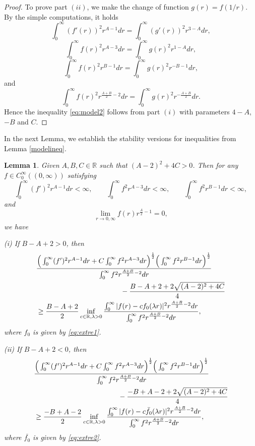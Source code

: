 \documentclass[a4paper,12pt]{article}
\theoremstyle{plain}
\newtheorem{lemma}[theorem]{Lemma}
\theoremstyle{definition}
\theoremstyle{remark}
\def\R{\mathbb R}%
\numberwithin{equation}{section}
\begin{document}
\begin{proof}
To prove part $(ii)$, we make the change of function $g(r) = f(1/r)$. By the simple computations, it holds
\[
\int_0^\infty (f'(r))^2 r^{A-1} dr = \int_0^\infty (g'(r))^2 r^{3-A} dr,
\]
\[
\int_0^\infty f(r)^2 r^{A-3} dr = \int_0^\infty g(r)^2 r^{1-A} dr,
\]
\[
\int_0^\infty f(r)^2 r^{B-1} dr = \int_0^\infty g(r)^2 r^{-B-1} dr,
\]
and
\[
\int_0^\infty f(r)^2 r^{\frac{A+B}2-2} dr = \int_0^\infty g(r)^2 r^{-\frac{A+B}2} dr.
\]
Hence the inequality \eqref{eq:model2} follows from part $(i)$ with parameters $4-A$, $-B$ and $C$.
\end{proof}

In the next Lemma, we establish the stability versions for inequalities from Lemma \ref{modelineq}.
\begin{lemma}\label{stabmodel}
Given $A,B,C\in \R$ such that $(A-2)^2 + 4C >0$. Then for any $f \in C_0^\infty((0,\infty))$ satisfying
\[
\int_0^\infty (f')^2 r^{A -1} dr < \infty,\qquad \int_0^\infty f^2 r^{A -3} dr < \infty, \qquad \int_0^\infty f^2 r^{B-1} dr < \infty,
\]
and 
\[
\lim_{r\to 0, \infty} f(r) r^{\frac A2 -1} = 0,
\]
we have
\begin{description}
\item(i) If $B-A+2 > 0$, then 
\begin{align*}%
&\frac{\Big(\int_0^\infty (f')^2 r^{A -1} dr + C \int_0^\infty f^2 r^{A -3} dr\Big)^{\frac12}\Big( \int_0^\infty f^2 r^{B-1} dr\Big)^{\frac12}}{\int_0^\infty f^2 r^{\frac{A+B}2-2} dr}\notag\\
&\qquad\qquad\qquad \qquad\qquad\qquad - \frac{B-A+2 + 2\sqrt{(A-2)^2 + 4C}}4 \notag\\
&\geq \frac{B-A+2}2 \inf_{c\in \R, \lambda > 0}  \frac{\int_0^\infty |f(r) - c f_0(\lambda r)|^2 r^{\frac{A+B}2-2} dr}{\int_0^\infty f^2 r^{\frac{A+B}2-2} dr},
\end{align*}
where $f_0$ is given by \eqref{eq:extre1}.
\item(ii) If $B-A+2 < 0$, then 
\begin{align*}%
&\frac{\Big(\int_0^\infty (f')^2 r^{A -1} dr + C \int_0^\infty f^2 r^{A -3} dr\Big)^{\frac12}\Big( \int_0^\infty f^2 r^{B-1} dr\Big)^{\frac12} }{\int_0^\infty f^2 r^{\frac{A+B}2-2} dr}\notag\\
&\qquad\qquad\qquad \qquad\qquad\qquad - \frac{-B+A-2 + 2\sqrt{(A-2)^2 + 4C}}4 \notag\\
&\geq \frac{-B+A -2}2 \inf_{c\in \R, \lambda > 0}  \frac{\int_0^\infty |f(r) - c \bar{f_0}(\lambda r)|^2 r^{\frac{A+B}2-2} dr}{\int_0^\infty f^2 r^{\frac{A+B}2-2} dr},
\end{align*}
where $\bar{f_0}$ is given by \eqref{eq:extre2}.
\end{description}
\end{lemma}
\end{document}
